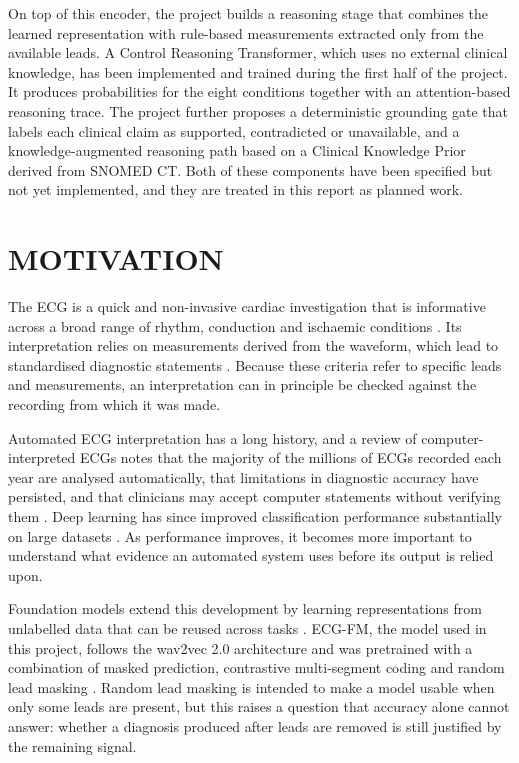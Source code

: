 On top of this encoder, the project builds a reasoning stage that combines the learned representation with rule-based measurements extracted only from the available leads. A Control Reasoning Transformer, which uses no external clinical knowledge, has been implemented and trained during the first half of the project. It produces probabilities for the eight conditions together with an attention-based reasoning trace. The project further proposes a deterministic grounding gate that labels each clinical claim as supported, contradicted or unavailable, and a knowledge-augmented reasoning path based on a Clinical Knowledge Prior derived from SNOMED CT. Both of these components have been specified but not yet implemented, and they are treated in this report as planned work.

\section{MOTIVATION}
The ECG is a quick and non-invasive cardiac investigation that is informative across a broad range of rhythm, conduction and ischaemic conditions \cite{KLIGFIELD2007AHA}. Its interpretation relies on measurements derived from the waveform, which lead to standardised diagnostic statements \cite{KLIGFIELD2007AHA}. Because these criteria refer to specific leads and measurements, an interpretation can in principle be checked against the recording from which it was made.

Automated ECG interpretation has a long history, and a review of computer-interpreted ECGs notes that the majority of the millions of ECGs recorded each year are analysed automatically, that limitations in diagnostic accuracy have persisted, and that clinicians may accept computer statements without verifying them \cite{SCHLAPFER2017COMPUTER}. Deep learning has since improved classification performance substantially on large datasets \cite{HANNUN2019CARDIOLOGIST,STRODTHOFF2021PTBXL}. As performance improves, it becomes more important to understand what evidence an automated system uses before its output is relied upon.

Foundation models extend this development by learning representations from unlabelled data that can be reused across tasks \cite{MCKEEN2025ECGFM}. ECG-FM, the model used in this project, follows the wav2vec 2.0 architecture and was pretrained with a combination of masked prediction, contrastive multi-segment coding and random lead masking \cite{MCKEEN2025ECGFM,OH2022LEADAGNOSTIC}. Random lead masking is intended to make a model usable when only some leads are present, but this raises a question that accuracy alone cannot answer: whether a diagnosis produced after leads are removed is still justified by the remaining signal.

